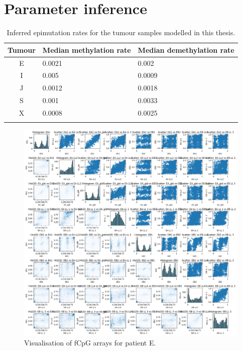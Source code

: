 \chapter{Parameter inference}\label{app:inference}

\begin{table}[h]
\centering
    \begin{tabularx}{0.85\textwidth}{|c|X|X|}
\hline
    Tumour & Median methylation rate & Median demethylation rate \\
\hline
    E & 0.0021 & 0.002  \\
    I & 0.005  & 0.0009 \\
    J & 0.0012 & 0.0018 \\
    S & 0.001  & 0.0033 \\
    X & 0.0008 & 0.0025 \\
\hline
\label{tab:inferred_epimutation_rates}
\end{tabularx}
\caption{Inferred epimutation rates for the tumour samples modelled in this
    thesis.}
\end{table}

\begin{figure}[ht]
\centering
\includegraphics[width=\textwidth]{Chapter_5/figures/fCpG_loci_E.png}
\caption{Visualisation of fCpG arrays for patient E.}
\label{fig:vis_E}
\end{figure}

